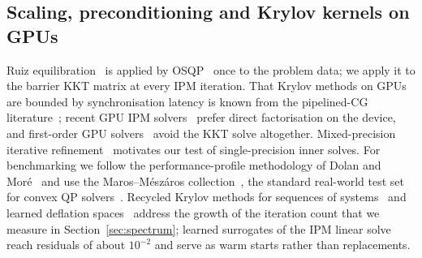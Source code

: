 \documentclass[11pt]{article}
\theoremstyle{definition}
\begin{document}
\subsection{Scaling, preconditioning and Krylov kernels on GPUs}
Ruiz equilibration~\cite{ruiz2001scaling,knight2014symmetry} is applied by OSQP~\cite{stellato2020osqp} once to the problem data; we apply it to the barrier KKT matrix at every IPM iteration. That Krylov methods on GPUs are bounded by synchronisation latency is known from the pipelined-CG literature~\cite{ghysels2014pipelined}; recent GPU IPM solvers~\cite{chen2025cuclarabel,pacaud2026condensed,regev2023hykkt} prefer direct factorisation on the device, and first-order GPU solvers~\cite{schubiger2020gpu,lu2025cupdlp} avoid the KKT solve altogether. Mixed-precision iterative refinement~\cite{carson2018three,wilkinson1963rounding} motivates our test of single-precision inner solves. For benchmarking we follow the performance-profile methodology of Dolan and Mor\'e~\cite{dolan2002benchmarking} and use the Maros--M\'esz\'aros collection~\cite{maros1999repository}, the standard real-world test set for convex QP solvers~\cite{stellato2020osqp}. Recycled Krylov methods for sequences of systems~\cite{parks2006gcrodr,wang2007rminres} and learned deflation spaces~\cite{luo2024neurkitt} address the growth of the iteration count that we measure in Section~\ref{sec:spectrum}; learned surrogates of the IPM linear solve~\cite{gao2024ipmlstm} reach residuals of about $10^{-2}$ and serve as warm starts rather than replacements.
\end{document}
